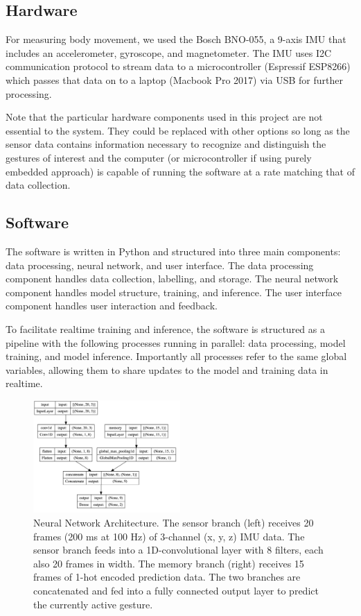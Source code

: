 \documentclass{nime-alternate} %
\begin{document}
\subsection{Hardware}
For measuring body movement, we used the Bosch BNO-055, a 9-axis IMU that includes an accelerometer, gyroscope, and magnetometer. The IMU uses I2C communication protocol to stream data to a microcontroller (Espressif ESP8266) which passes that data on to a laptop  (Macbook Pro 2017) via USB for further processing.

Note that the particular hardware components used in this project are not essential to the system. They could be replaced with other options so long as the sensor data contains information necessary to recognize and distinguish the gestures of interest and the computer (or microcontroller if using purely embedded approach) is capable of running the software at a rate matching that of data collection.

\subsection{Software}
The software is written in Python and structured into three main components: data processing, neural network, and user interface. The data processing component handles data collection, labelling, and storage. The neural network component handles model structure, training, and inference. The user interface component handles user interaction and feedback.

To facilitate realtime training and inference, the software is structured as a pipeline with the following processes running in parallel: data processing, model training, and model inference. Importantly all processes refer to the same global variables, allowing them to share updates to the model and training data in realtime.


\begin{figure}[h]
    \includegraphics[width=0.5\textwidth]{../figures/model_diagram.jpg}
    \caption{Neural Network Architecture. The sensor branch (left) receives 20 frames (200 ms at 100 Hz) of 3-channel (x, y, z) IMU data. The sensor branch feeds into a 1D-convolutional layer with 8 filters, each also 20 frames in width. The memory branch (right) receives 15 frames of 1-hot encoded prediction data. The two branches are concatenated and fed into a fully connected output layer to predict the currently active gesture.}
    \label{fig:neural_network}
\end{figure}
\end{document}
